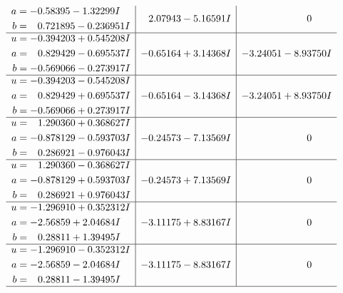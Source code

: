 \documentclass[1p]{elsarticle_modified}
\theoremstyle{definition}
\begin{document}
$$\begin{array}{c|c|c}
\begin{aligned}
a &= -0.58395 - 1.32299 I \\
b &= \phantom{-}0.721895 - 0.236951 I\end{aligned}
 & \phantom{-}2.07943 - 5.16591 I & \phantom{-0.000000 } 0 \\ \hline\begin{aligned}
u &= -0.394203 + 0.545208 I \\
a &= \phantom{-}0.829429 - 0.695537 I \\
b &= -0.569066 - 0.273917 I\end{aligned}
 & -0.65164 + 3.14368 I & -3.24051 - 8.93750 I \\ \hline\begin{aligned}
u &= -0.394203 - 0.545208 I \\
a &= \phantom{-}0.829429 + 0.695537 I \\
b &= -0.569066 + 0.273917 I\end{aligned}
 & -0.65164 - 3.14368 I & -3.24051 + 8.93750 I \\ \hline\begin{aligned}
u &= \phantom{-}1.290360 + 0.368627 I \\
a &= -0.878129 - 0.593703 I \\
b &= \phantom{-}0.286921 - 0.976043 I\end{aligned}
 & -0.24573 - 7.13569 I & \phantom{-0.000000 } 0 \\ \hline\begin{aligned}
u &= \phantom{-}1.290360 - 0.368627 I \\
a &= -0.878129 + 0.593703 I \\
b &= \phantom{-}0.286921 + 0.976043 I\end{aligned}
 & -0.24573 + 7.13569 I & \phantom{-0.000000 } 0 \\ \hline\begin{aligned}
u &= -1.296910 + 0.352312 I \\
a &= -2.56859 + 2.04684 I \\
b &= \phantom{-}0.28811 + 1.39495 I\end{aligned}
 & -3.11175 + 8.83167 I & \phantom{-0.000000 } 0 \\ \hline\begin{aligned}
u &= -1.296910 - 0.352312 I \\
a &= -2.56859 - 2.04684 I \\
b &= \phantom{-}0.28811 - 1.39495 I\end{aligned}
 & -3.11175 - 8.83167 I & \phantom{-0.000000 } 0\\
 \hline 

\end{array}$$
\end{document}
